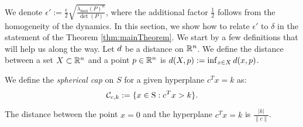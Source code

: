 We denote $\epsilon':=\frac{\epsilon}{2} \sqrt{\frac{\lambda_{\max}(P)^n}{\det(P)}}$, where the additional factor $\frac{1}{2}$ follows from the homogeneity of the dynamics. In this section, we show how to relate $\epsilon'$ to $\delta$ in the statement of the Theorem \ref{thm:mainTheorem}. We start by a few definitions that will help us along the way. Let $d$ be a distance on $\mathbb{R}^n$. We define the distance between a set $X \subset \mathbb{R}^n$ and a point $p \in \mathbb{R}^n$ is $d(X, p):=\inf_{x \in X}d(x,p)$.

\begin{definition}We define the \emph{spherical cap} on $S$ for a given hyperplane $c^Tx = k$ as:
\begin{equation*}\mathcal{C}_{c,k} := \{x \in \text{S} : c^Tx >k\}.\end{equation*}
\end{definition}





\begin{proposition}\label{prop:distance}The distance between the point $x=0$ and the hyperplane $c^Tx = k$ is $\frac{|k|}{\|c\|}$.
\end{proposition}


